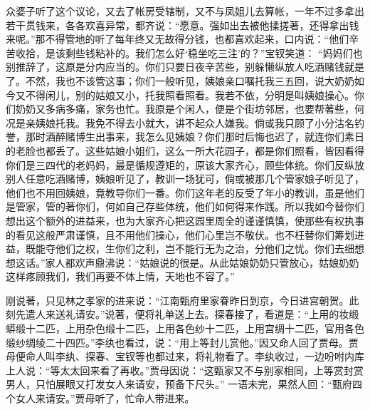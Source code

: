 \begin{parag}


    众婆子听了这个议论，又去了帐房受辖制，又不与凤姐儿去算帐，一年不过多拿出若干贯钱来，各各欢喜异常，都齐说：“愿意。强如出去被他揉搓著，还得拿出钱来呢。”那不得管地的听了每年终又无故得分钱，也都喜欢起来，口内说：“他们辛苦收拾，是该剩些钱粘补的。我们怎么好‘稳坐吃三注’的？”宝钗笑道： “妈妈们也别推辞了，这原是分内应当的。你们只要日夜辛苦些，别躲懒纵放人吃酒赌钱就是了。不然，我也不该管这事；你们一般听见，姨娘亲口嘱托我三五回，说大奶奶如今又不得闲儿，别的姑娘又小，托我照看照看。我若不依，分明是叫姨娘操心。你们奶奶又多病多痛，家务也忙。我原是个闲人，便是个街坊邻居，也要帮著些，何况是亲姨娘托我。我免不得去小就大，讲不起众人嫌我。倘或我只顾了小分沽名钓誉，那时酒醉赌博生出事来，我怎么见姨娘？你们那时后悔也迟了，就连你们素日的老脸也都丢了。这些姑娘小姐们，这么一所大花园子，都是你们照看，皆因看得你们是三四代的老妈妈，最是循规遵矩的，原该大家齐心，顾些体统。你们反纵放别人任意吃酒赌博，姨娘听见了，教训一场犹可，倘或被那几个管家娘子听见了，他们也不用回姨娘，竟教导你们一番。你们这年老的反受了年小的教训，虽是他们是管家，管的著你们，何如自己存些体统，他们如何得来作践。所以我如今替你们想出这个额外的进益来，也为大家齐心把这园里周全的谨谨慎慎，使那些有权执事的看见这般严肃谨慎，且不用他们操心，他们心里岂不敬伏。也不枉替你们筹划进益，既能夺他们之权，生你们之利，岂不能行无为之治，分他们之忧。你们去细想想这话。”家人都欢声鼎沸说：“姑娘说的很是。从此姑娘奶奶只管放心，姑娘奶奶这样疼顾我们，我们再要不体上情，天地也不容了。”
\end{parag}


\begin{parag}


    刚说著，只见林之孝家的进来说：“江南甄府里家眷昨日到京，今日进宫朝贺。此刻先遣人来送礼请安。”说著，便将礼单送上去。探春接了，看道是：“上用的妆缎蟒缎十二匹，上用杂色缎十二匹，上用各色纱十二匹，上用宫绸十二匹，官用各色缎纱绸绫二十四匹。”李纨也看过，说：“用上等封儿赏他。”因又命人回了贾母。贾母便命人叫李纨、探春、宝钗等也都过来，将礼物看了。李纨收过，一边吩咐内库上人说：“等太太回来看了再收。”贾母因说：“这甄家又不与别家相同，上等赏封赏男人，只怕展眼又打发女人来请安，预备下尺头。” 一语未完，果然人回：“甄府四个女人来请安。”贾母听了，忙命人带进来。
\end{parag}


